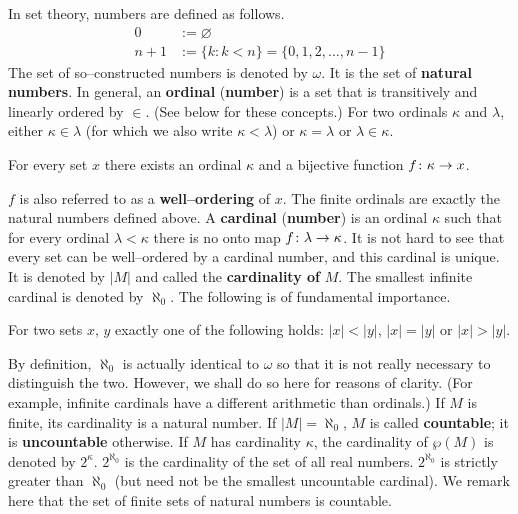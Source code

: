 In set theory, numbers are defined as follows.
\begin{equation}
\begin{split}
0   & := \varnothing \\
n+1 & := \{k : k < n\} = \{0, 1, 2, \dotsc, n-1\}
\end{split}
\end{equation}
The set of so--constructed numbers is denoted by $\omega$. It
is the set of \textbf{natural numbers}.
In general, an \textbf{ordinal} (\textbf{number}) is a set that is
transitively and linearly ordered by $\in$. (See below for these
concepts.) For two ordinals $\kappa$ and $\lambda$, either $\kappa
\in \lambda$ (for which we also write $\kappa < \lambda$) or
$\kappa = \lambda$ or $\lambda \in \kappa$. 
\begin{thm}
For every set $x$ there exists an ordinal $\kappa$ and a bijective 
function $f \colon \kappa \rightarrow x$.
\end{thm}
$f$ is also referred to as a \textbf{well--ordering} of $x$.
The finite ordinals are exactly the natural numbers defined above.
A \textbf{cardinal} (\textbf{number}) is an ordinal $\kappa$ such 
that for every ordinal $\lambda < \kappa$ there is no onto map 
$f \colon \lambda \rightarrow \kappa$. It is not hard to see that every set 
can be well--ordered by a cardinal number, and this cardinal is unique. 
It is denoted by $|M|$ and called the \textbf{cardinality of} $M$. The 
smallest infinite cardinal is denoted by $\aleph_0$. The following is 
of fundamental importance.
\begin{thm}
For two sets $x$, $y$ exactly one of the following holds: $|x| < 
|y|$, $|x| = |y|$ or $|x| > |y|$.
\end{thm}
By definition, $\aleph_0$ is actually identical to $\omega$ so that 
it is not really necessary to distinguish the two. However, we shall 
do so here for reasons of clarity. (For example, infinite cardinals 
have a different arithmetic than ordinals.) If $M$ is finite, its 
cardinality is a natural number. If $|M| = \aleph_0$, $M$ is called 
\textbf{countable}; it is \textbf{uncountable} otherwise.
If $M$ has cardinality $\kappa$, the cardinality of $\wp(M)$
is denoted by $2^{\kappa}$. $2^{\aleph_0}$ is the cardinality
of the set of all real numbers. $2^{\aleph_0}$ is strictly
greater than $\aleph_0$ (but need not be the smallest uncountable 
cardinal). We remark here that the set of finite sets of natural 
numbers is countable.

